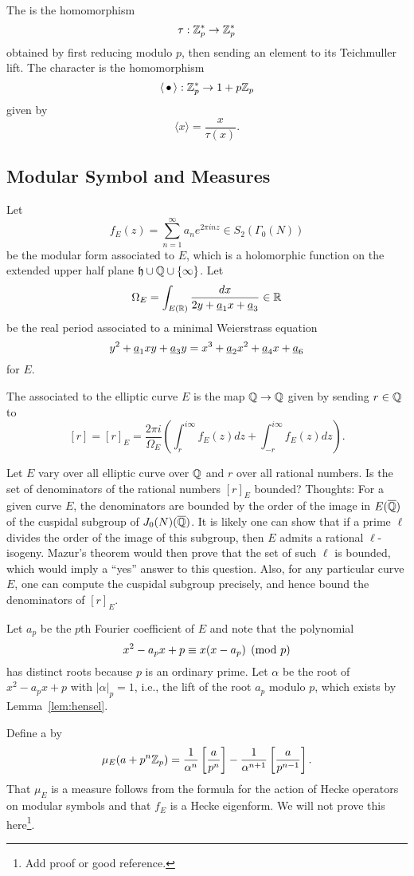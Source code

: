 The  is the homomorphism
$$
  \tau: \mathbb{Z}_p^* \to \mathbb{Z}_p^*
$$
obtained by first reducing modulo $p$, then sending an element
to its Teichmuller lift. 
The  character is the homomorphism
$$
  \langle\, \bullet\, \rangle: \mathbb{Z}_p^* \to 1 + p\mathbb{Z}_p
$$
given by
$$
   \langle x \rangle = \frac{x}{\tau(x)}.
$$

\subsection{Modular Symbol and Measures}\label{sec:modsymmeasure}
Let 
$$
  f_E(z) = \sum_{n=1}^{\infty} a_n e^{2\pi i n z} \in S_2(\Gamma_0(N))
$$
be the modular form associated to $E$, which is a holomorphic
function on the extended upper half plane $\mathfrak{h}\cup\mathbb{Q}\cup\{\infty\}$.  
Let 
$$
  \Omega_E = \int_{E(\mathbb{R})} \frac{dx}{2y + \underline{a}_1 x + \underline{a}_3} \in \mathbb{R}
$$ 
be the real period
associated to a minimal Weierstrass equation 
$$
  y^2 + \underline{a}_1 xy + \underline{a}_3 y = x^3 +\underline{a}_2 x^2 + \underline{a}_4 x + \underline{a}_6
$$
for $E$.

The  associated
to the elliptic curve $E$ is the map $\mathbb{Q} \to \mathbb{Q}$
given by sending $r\in \mathbb{Q}$ to 
$$
  [r] = [r]_E=
\frac{2 \pi i }{\Omega_E} 
\left( \int_r^{i\infty} f_E(z) dz + \int_{-r}^{i\infty} f_E(z) dz
\right).
$$
\begin{question}\label{quest:bound}
Let $E$ vary over all elliptic curve over $\mathbb{Q}$
and $r$ over all rational numbers.  Is the set
of denominators of the rational numbers $[r]_E$ 
bounded?  Thoughts: For a given curve $E$, the
denominators are bounded by the order of the image
in $E(\overline{\mathbb{Q}})$ of the cuspidal subgroup of 
$J_0(N)(\overline{\mathbb{Q}})$.  It is likely one can show that
if a prime $\ell$ divides the order of the image
of this subgroup, then $E$ admits a rational $\ell$-isogeny.
Mazur's theorem would then prove that the set of such
$\ell$ is bounded, which would imply a ``yes'' answer
to this question.  Also, for any particular curve $E$,
one can compute the cuspidal subgroup precisely, and
hence bound the denominators of $[r]_E$.
\end{question}

Let $a_p$ be the $p$th Fourier coefficient of $E$ and note
that the polynomial
$$
  x^2 - a_p x + p \equiv x(x-a_p) \pmod{p}
$$
has distinct roots because $p$ is an ordinary prime. 
Let $\alpha$ be the root of $x^2-a_px+p$ with $|\alpha|_p = 1$,
i.e., the lift of the root $a_p$ modulo $p$, which exists by
Lemma~\ref{lem:hensel}.

Define a  by 
$$
\mu_E(a+p^n \mathbb{Z}_p) = 
\frac{1}{\alpha^n} \left[\frac{a}{p^n}\right] -\frac{1}{\alpha^{n+1}} \left[\frac{a}{p^{n-1}}\right].
$$
That $\mu_E$ is a measure follows from the formula
for the action of Hecke operators on modular symbols
and that $f_E$ is a Hecke eigenform.  We will not
prove this here\footnote{Add proof or good reference.}.

